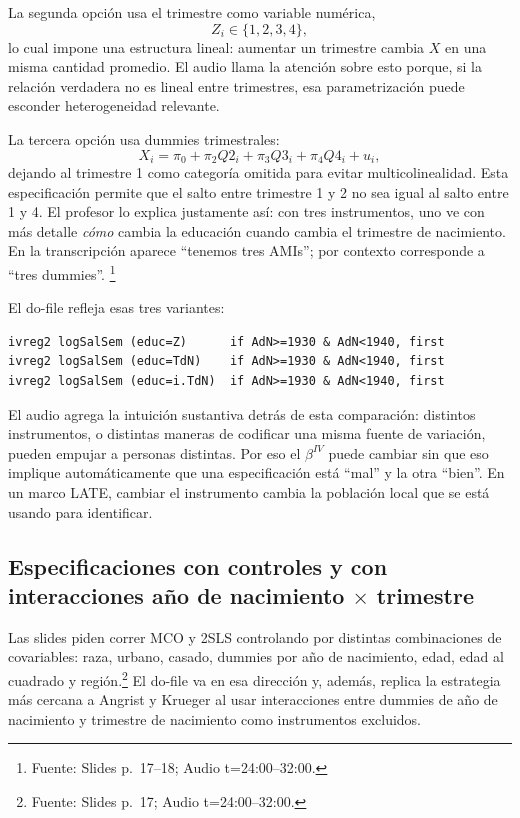 \documentclass[11pt]{article}
\newcommand{\q}[1]{``#1''}
\newcommand{\source}[2]{\footnote{Fuente: Slides p.~#1; Audio t=#2.}}
\begin{document}
La segunda opción usa el trimestre como variable numérica,
\[
Z_i\in\{1,2,3,4\},
\]
lo cual impone una estructura lineal: aumentar un trimestre cambia \(X\) en una misma cantidad promedio. El audio llama la atención sobre esto porque, si la relación verdadera no es lineal entre trimestres, esa parametrización puede esconder heterogeneidad relevante.

La tercera opción usa dummies trimestrales:
\[
X_i=\pi_0+\pi_2Q2_i+\pi_3Q3_i+\pi_4Q4_i+u_i,
\]
dejando al trimestre 1 como categoría omitida para evitar multicolinealidad. Esta especificación permite que el salto entre trimestre 1 y 2 no sea igual al salto entre 1 y 4. El profesor lo explica justamente así: con tres instrumentos, uno ve con más detalle \emph{cómo} cambia la educación cuando cambia el trimestre de nacimiento. En la transcripción aparece \q{tenemos tres AMIs}; por contexto corresponde a \q{tres dummies}. \source{17--18}{24:00--32:00}

El do-file refleja esas tres variantes:
\begin{lstlisting}
ivreg2 logSalSem (educ=Z)      if AdN>=1930 & AdN<1940, first
ivreg2 logSalSem (educ=TdN)    if AdN>=1930 & AdN<1940, first
ivreg2 logSalSem (educ=i.TdN)  if AdN>=1930 & AdN<1940, first
\end{lstlisting}

El audio agrega la intuición sustantiva detrás de esta comparación: distintos instrumentos, o distintas maneras de codificar una misma fuente de variación, pueden empujar a personas distintas. Por eso el \(\beta^{IV}\) puede cambiar sin que eso implique automáticamente que una especificación está \q{mal} y la otra \q{bien}. En un marco LATE, cambiar el instrumento cambia la población local que se está usando para identificar.

\subsection{\texorpdfstring{Especificaciones con controles y con interacciones año de nacimiento \(\times\) trimestre}{Especificaciones con controles y con interacciones año de nacimiento x trimestre}}

Las slides piden correr MCO y 2SLS controlando por distintas combinaciones de covariables: raza, urbano, casado, dummies por año de nacimiento, edad, edad al cuadrado y región.\source{17}{24:00--32:00} El do-file va en esa dirección y, además, replica la estrategia más cercana a Angrist y Krueger al usar interacciones entre dummies de año de nacimiento y trimestre de nacimiento como instrumentos excluidos.
\end{document}
